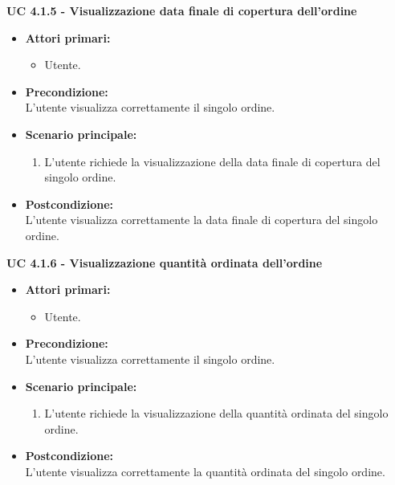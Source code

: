 \vspace{0.4cm}

\noindent \textbf{\large UC 4.1.5 - Visualizzazione data finale di copertura dell'ordine}
\label{uc:visualizzazione-data-finale-copertura}
\begin{itemize}

	\item \textbf{Attori primari: }
		\begin{itemize}
			\item Utente.
		\end{itemize}

	\item \textbf{Precondizione: }\\[0.3cm]
		L'utente visualizza correttamente il singolo ordine.

	\item \textbf{Scenario principale: }
		\begin{enumerate}
			\item L'utente richiede la visualizzazione della data finale di copertura del singolo ordine.
		\end{enumerate}
		

	\item \textbf{Postcondizione: }\\[0.3cm]
		L'utente visualizza correttamente la data finale di copertura del singolo ordine.

\end{itemize}

\vspace{0.4cm}

\newpage

\noindent \textbf{\large UC 4.1.6 - Visualizzazione quantità ordinata dell'ordine}
\label{uc:visualizzazione-quantita-ordinata}
\begin{itemize}

	\item \textbf{Attori primari: }
		\begin{itemize}
			\item Utente.
		\end{itemize}

	\item \textbf{Precondizione: }\\[0.3cm]
		L'utente visualizza correttamente il singolo ordine.

	\item \textbf{Scenario principale: }
		\begin{enumerate}
			\item L'utente richiede la visualizzazione della quantità ordinata del singolo ordine.
		\end{enumerate}
		

	\item \textbf{Postcondizione: }\\[0.3cm]
		L'utente visualizza correttamente la quantità ordinata del singolo ordine.

\end{itemize}

